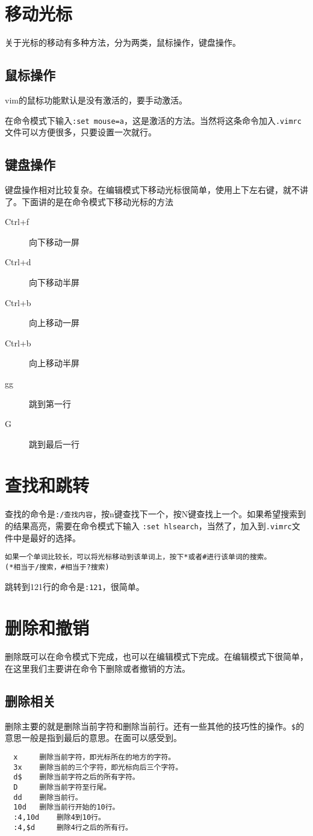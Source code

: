 \documentclass[a4paper,12pt]{ctexart}%
\begin{document}
\section{移动光标}
关于光标的移动有多种方法，分为两类，鼠标操作，键盘操作。
\subsection{鼠标操作}
vim的鼠标功能默认是没有激活的，要手动激活。

在命令模式下输入\verb|:set mouse=a|，这是激活的方法。当然将这条命令加入\verb|.vimrc|文件可以方便很多，只要设置一次就行。
\subsection{键盘操作}
键盘操作相对比较复杂。在编辑模式下移动光标很简单，使用上下左右键，就不讲了。下面讲的是在命令模式下移动光标的方法
\begin{description}
  \item[Ctrl+f] 向下移动一屏
  \item[Ctrl+d] 向下移动半屏
  \item[Ctrl+b] 向上移动一屏
  \item[Ctrl+b] 向上移动半屏
  \item[gg]     跳到第一行
  \item[G]      跳到最后一行
\end{description}

\section{查找和跳转}
查找的命令是\verb|:/查找内容|，按n键查找下一个，按N键查找上一个。如果希望搜索到的结果高亮，需要在命令模式下输入 \verb|:set hlsearch|，当然了，加入到\verb|.vimrc|文件中是最好的选择。
\begin{verbatim}
如果一个单词比较长，可以将光标移动到该单词上，按下*或者#进行该单词的搜索。
(*相当于/搜索，#相当于?搜索)
\end{verbatim}
跳转到121行的命令是\verb|:121|，很简单。

\section{删除和撤销}
删除既可以在命令模式下完成，也可以在编辑模式下完成。在编辑模式下很简单，在这里我们主要讲在命令下删除或者撤销的方法。
\subsection{删除相关}
删除主要的就是删除当前字符和删除当前行。还有一些其他的技巧性的操作。\verb|$|的意思一般是指到最后的意思。在面可以感受到。
\begin{verbatim}
  x     删除当前字符，即光标所在的地方的字符。
  3x    删除当前的三个字符，即光标向后三个字符。
  d$    删除当前字符之后的所有字符。
  D     删除当前字符至行尾。
  dd    删除当前行。
  10d   删除当前行开始的10行。
  :4,10d    删除4到10行。
  :4,$d     删除4行之后的所有行。
\end{verbatim}
\end{document}
